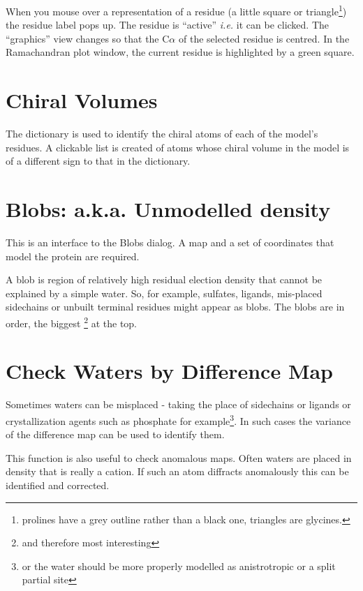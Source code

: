 \documentclass{book}
\begin{document}
When you mouse over a representation of a residue (a little square or
triangle\footnote{prolines have a grey outline rather than a black
  one, triangles are glycines.}) the residue label pops up.  The
residue is ``active'' \emph{i.e.} it can be clicked.  The ``graphics''
view changes so that the C$\alpha$ of the selected residue is centred.
In the Ramachandran plot window, the current residue is highlighted by
a green square.


\section{Chiral Volumes}
The dictionary is used to identify the chiral atoms of each of the
model's residues.  A clickable list is created of atoms whose chiral
volume in the model is of a different sign to that in the dictionary.

\section{Blobs: a.k.a. Unmodelled density}
\label{sec:blobs}
This is an interface to the Blobs dialog.  A map and a set of coordinates that model the
protein are required.

A blob is region of relatively high residual election density that
cannot be explained by a simple water. So,
for example, sulfates, ligands, mis-placed sidechains or unbuilt
terminal residues might appear as blobs.  The blobs are in order, the
biggest \footnote{and therefore most interesting} at the top.

\section{Check Waters by Difference Map}
Sometimes waters can be misplaced - taking the place of sidechains or
ligands or crystallization agents such as phosphate for
example\footnote{or the water should be more properly modelled as
  anistrotropic or a split partial site}.  In such cases the variance
of the difference map can be used to identify them.

This function is also useful to check anomalous maps.  Often waters
are placed in density that is really a cation.  If such an atom
diffracts anomalously this can be identified and corrected.
\end{document}
